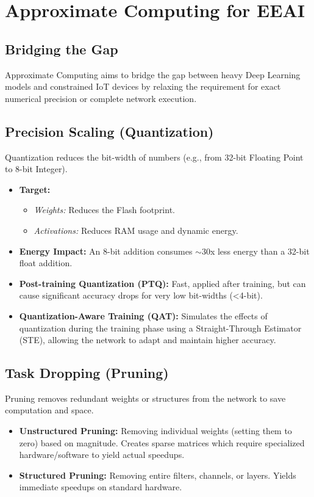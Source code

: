 \section{Approximate Computing for EEAI}

\subsection{Bridging the Gap}
Approximate Computing aims to bridge the gap between heavy Deep Learning models and constrained IoT devices by relaxing the requirement for exact numerical precision or complete network execution.

\subsection{Precision Scaling (Quantization)}
Quantization reduces the bit-width of numbers (e.g., from 32-bit Floating Point to 8-bit Integer).
\begin{itemize}
    \item \textbf{Target:} 
    \begin{itemize}
        \item \textit{Weights:} Reduces the Flash footprint.
        \item \textit{Activations:} Reduces RAM usage and dynamic energy.
    \end{itemize}
    \item \textbf{Energy Impact:} An 8-bit addition consumes $\sim 30$x less energy than a 32-bit float addition.
    \item \textbf{Post-training Quantization (PTQ):} Fast, applied after training, but can cause significant accuracy drops for very low bit-widths (<4-bit).
    \item \textbf{Quantization-Aware Training (QAT):} Simulates the effects of quantization during the training phase using a Straight-Through Estimator (STE), allowing the network to adapt and maintain higher accuracy.
\end{itemize}

\subsection{Task Dropping (Pruning)}
Pruning removes redundant weights or structures from the network to save computation and space.
\begin{itemize}
    \item \textbf{Unstructured Pruning:} Removing individual weights (setting them to zero) based on magnitude. Creates sparse matrices which require specialized hardware/software to yield actual speedups.
    \item \textbf{Structured Pruning:} Removing entire filters, channels, or layers. Yields immediate speedups on standard hardware.
\end{itemize}

